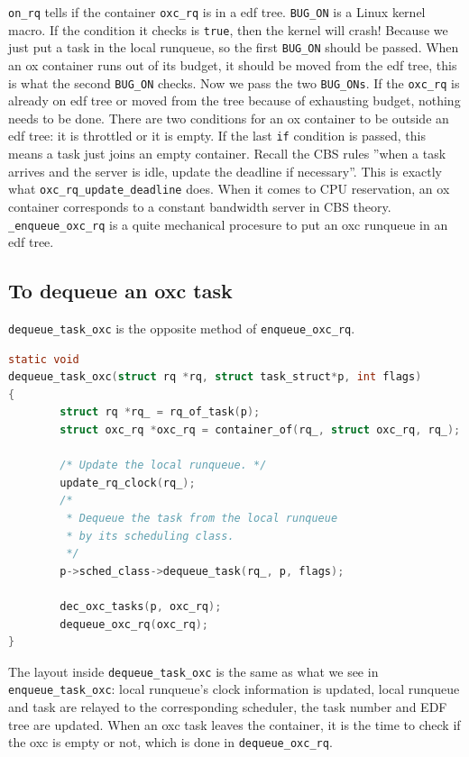 \texttt{on\_rq} tells if the container \texttt{oxc\_rq} is in a edf tree.
\texttt{BUG\_ON} is a Linux kernel macro. If the condition it checks is 
\texttt{true}, then the kernel will crash! Because we just put a task
in the local runqueue, so the first \texttt{BUG\_ON} should be passed.
When an ox container runs out of its budget, it should be moved from the
edf tree, this is what the second \texttt{BUG\_ON} checks. Now we pass
the two \texttt{BUG\_ONs}. If the \texttt{oxc\_rq} is already on edf 
tree or moved from the tree because of exhausting budget, nothing needs 
to be done. There are two conditions for an ox container to be outside
an edf tree: it is throttled or it is empty. If the last \texttt{if}
condition is passed, this means a task just joins an empty container. 
Recall the CBS rules ''when a task arrives and the server is idle, update 
the deadline if necessary''. This is exactly what 
\texttt{oxc\_rq\_update\_deadline} does. When it comes to CPU reservation,
an ox container corresponds to a constant bandwidth server in CBS theory.
\texttt{\_enqueue\_oxc\_rq} is a quite mechanical procesure to put an
oxc runqueue in an edf tree.

\subsection{To dequeue an oxc task\label{sec:dequeue_task_oxc}}

\texttt{dequeue\_task\_oxc} is the opposite method of 
\texttt{enqueue\_oxc\_rq}.

\begin{lstlisting}[language=C, 
		caption={To remove a task from the oxc local runqueue}]
static void 
dequeue_task_oxc(struct rq *rq, struct task_struct*p, int flags)
{
        struct rq *rq_ = rq_of_task(p);
        struct oxc_rq *oxc_rq = container_of(rq_, struct oxc_rq, rq_);

        /* Update the local runqueue. */
        update_rq_clock(rq_);
        /*
         * Dequeue the task from the local runqueue 
         * by its scheduling class.
         */
        p->sched_class->dequeue_task(rq_, p, flags);

        dec_oxc_tasks(p, oxc_rq);
        dequeue_oxc_rq(oxc_rq);
}
\end{lstlisting}

The layout inside \texttt{dequeue\_task\_oxc} is the same as what we see in
\texttt{enqueue\_task\_oxc}: local runqueue's clock information is updated,
local runqueue and task are relayed to the corresponding scheduler, 
the task number and EDF tree are updated. When an oxc task leaves the 
container, it is the time to check if the oxc is empty or not, which is 
done in \texttt{dequeue\_oxc\_rq}.

